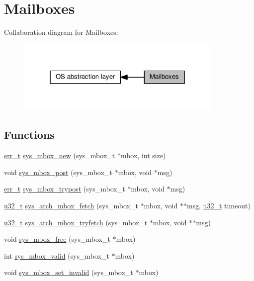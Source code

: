 \hypertarget{group__sys__mbox}{}\section{Mailboxes}
\label{group__sys__mbox}
Collaboration diagram for Mailboxes\+:
\nopagebreak
\begin{figure}[H]
\begin{center}
\leavevmode
\includegraphics[width=283pt]{group__sys__mbox}
\end{center}
\end{figure}
\subsection*{Functions}
\begin{DoxyCompactItemize}
\item 
\hyperlink{group__infrastructure__errors_gaf02d9da80fd66b4f986d2c53d7231ddb}{err\+\_\+t} \hyperlink{group__sys__mbox_gab9793f30642de06ce87827e9adbe30cc}{sys\+\_\+mbox\+\_\+new} (sys\+\_\+mbox\+\_\+t $\ast$mbox, int size)
\item 
void \hyperlink{group__sys__mbox_ga9d068386a3c53dd01b8af99c3ef77555}{sys\+\_\+mbox\+\_\+post} (sys\+\_\+mbox\+\_\+t $\ast$mbox, void $\ast$msg)
\item 
\hyperlink{group__infrastructure__errors_gaf02d9da80fd66b4f986d2c53d7231ddb}{err\+\_\+t} \hyperlink{group__sys__mbox_gaa36345e48a49d67cbb0878cd4cbd2195}{sys\+\_\+mbox\+\_\+trypost} (sys\+\_\+mbox\+\_\+t $\ast$mbox, void $\ast$msg)
\item 
\hyperlink{group__compiler__abstraction_ga4c14294869aceba3ef9d4c0c302d0f33}{u32\+\_\+t} \hyperlink{group__sys__mbox_ga6464cd77cf6799bd8b3d6c840166a2e8}{sys\+\_\+arch\+\_\+mbox\+\_\+fetch} (sys\+\_\+mbox\+\_\+t $\ast$mbox, void $\ast$$\ast$msg, \hyperlink{group__compiler__abstraction_ga4c14294869aceba3ef9d4c0c302d0f33}{u32\+\_\+t} timeout)
\item 
\hyperlink{group__compiler__abstraction_ga4c14294869aceba3ef9d4c0c302d0f33}{u32\+\_\+t} \hyperlink{group__sys__mbox_gafab441b130b4ec417012835dbe1e497c}{sys\+\_\+arch\+\_\+mbox\+\_\+tryfetch} (sys\+\_\+mbox\+\_\+t $\ast$mbox, void $\ast$$\ast$msg)
\item 
void \hyperlink{group__sys__mbox_gac641a45812155d2234ef80dd6412882f}{sys\+\_\+mbox\+\_\+free} (sys\+\_\+mbox\+\_\+t $\ast$mbox)
\item 
int \hyperlink{group__sys__mbox_ga8bcfab4bd791dd33f69a778e7585275d}{sys\+\_\+mbox\+\_\+valid} (sys\+\_\+mbox\+\_\+t $\ast$mbox)
\item 
void \hyperlink{group__sys__mbox_ga53ddec9d7f5500c5b1d982cd17493172}{sys\+\_\+mbox\+\_\+set\+\_\+invalid} (sys\+\_\+mbox\+\_\+t $\ast$mbox)
\end{DoxyCompactItemize}



